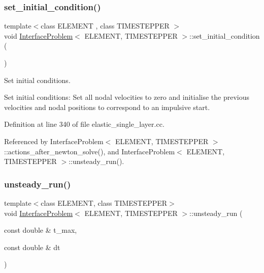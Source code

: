 \subsubsection{\texorpdfstring{set\+\_\+initial\+\_\+condition()}{set\_initial\_condition()}\hspace{0.1cm}{\footnotesize\ttfamily [2/2]}}
{\footnotesize\ttfamily template$<$class E\+L\+E\+M\+E\+NT , class T\+I\+M\+E\+S\+T\+E\+P\+P\+ER $>$ \\
void \hyperlink{classInterfaceProblem}{Interface\+Problem}$<$ E\+L\+E\+M\+E\+NT, T\+I\+M\+E\+S\+T\+E\+P\+P\+ER $>$\+::set\+\_\+initial\+\_\+condition (\begin{DoxyParamCaption}{ }\end{DoxyParamCaption})}



Set initial conditions. 

Set initial conditions\+: Set all nodal velocities to zero and initialise the previous velocities and nodal positions to correspond to an impulsive start. 

Definition at line 340 of file elastic\+\_\+single\+\_\+layer.\+cc.



Referenced by Interface\+Problem$<$ E\+L\+E\+M\+E\+N\+T, T\+I\+M\+E\+S\+T\+E\+P\+P\+E\+R $>$\+::actions\+\_\+after\+\_\+newton\+\_\+solve(), and Interface\+Problem$<$ E\+L\+E\+M\+E\+N\+T, T\+I\+M\+E\+S\+T\+E\+P\+P\+E\+R $>$\+::unsteady\+\_\+run().

\mbox{\label{classInterfaceProblem_adf1f4e43d10939e4323e0e315b711085}} 
\subsubsection{\texorpdfstring{unsteady\+\_\+run()}{unsteady\_run()}\hspace{0.1cm}{\footnotesize\ttfamily [1/2]}}
{\footnotesize\ttfamily template$<$class E\+L\+E\+M\+E\+NT, class T\+I\+M\+E\+S\+T\+E\+P\+P\+ER$>$ \\
void \hyperlink{classInterfaceProblem}{Interface\+Problem}$<$ E\+L\+E\+M\+E\+NT, T\+I\+M\+E\+S\+T\+E\+P\+P\+ER $>$\+::unsteady\+\_\+run (\begin{DoxyParamCaption}\item[{const double \&}]{t\+\_\+max,  }\item[{const double \&}]{dt }\end{DoxyParamCaption})}



